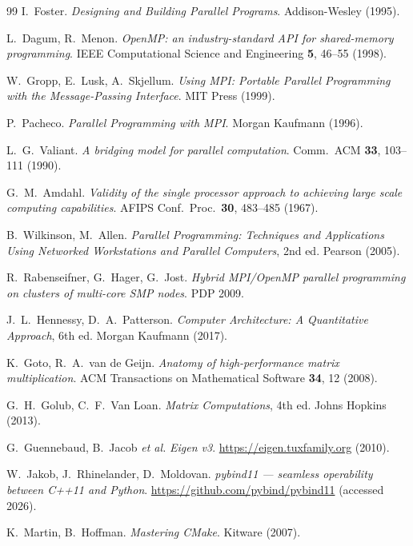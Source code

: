 \documentclass[11pt,a4paper]{article}
\begin{document}
\begin{thebibliography}{99}
  I.~Foster.
  \textit{Designing and Building Parallel Programs}. Addison-Wesley (1995).

  L.~Dagum, R.~Menon.
  \textit{OpenMP: an industry-standard API for shared-memory programming}.
  IEEE Computational Science and Engineering \textbf{5}, 46--55 (1998).

  W.~Gropp, E.~Lusk, A.~Skjellum.
  \textit{Using MPI: Portable Parallel Programming with the Message-Passing
  Interface}. MIT Press (1999).

  P.~Pacheco.
  \textit{Parallel Programming with MPI}. Morgan Kaufmann (1996).

  L.~G.~Valiant.
  \textit{A bridging model for parallel computation}.
  Comm.\ ACM \textbf{33}, 103--111 (1990).

  G.~M.~Amdahl.
  \textit{Validity of the single processor approach to achieving large scale
  computing capabilities}. AFIPS Conf.\ Proc.\ \textbf{30}, 483--485 (1967).

  B.~Wilkinson, M.~Allen.
  \textit{Parallel Programming: Techniques and Applications Using Networked
  Workstations and Parallel Computers}, 2nd ed. Pearson (2005).

  R.~Rabenseifner, G.~Hager, G.~Jost.
  \textit{Hybrid MPI/OpenMP parallel programming on clusters of multi-core SMP
  nodes}. PDP 2009.

  J.~L.~Hennessy, D.~A.~Patterson.
  \textit{Computer Architecture: A Quantitative Approach}, 6th ed. Morgan Kaufmann
  (2017).

  K.~Goto, R.~A.~van de Geijn.
  \textit{Anatomy of high-performance matrix multiplication}.
  ACM Transactions on Mathematical Software \textbf{34}, 12 (2008).

  G.~H.~Golub, C.~F.~Van Loan.
  \textit{Matrix Computations}, 4th ed. Johns Hopkins (2013).

  G.~Guennebaud, B.~Jacob \textit{et al.}
  \textit{Eigen v3}. \url{https://eigen.tuxfamily.org} (2010).

  W.~Jakob, J.~Rhinelander, D.~Moldovan.
  \textit{pybind11 --- seamless operability between C++11 and Python}.
  \url{https://github.com/pybind/pybind11} (accessed 2026).

  K.~Martin, B.~Hoffman.
  \textit{Mastering CMake}. Kitware (2007).


\end{thebibliography}
\end{document}
